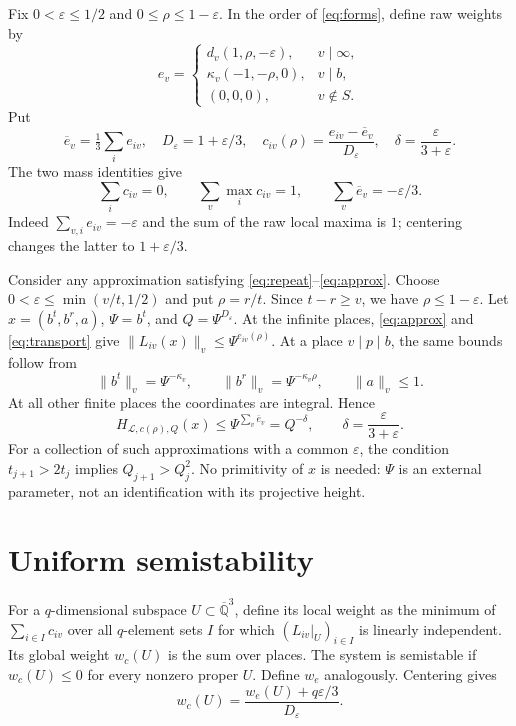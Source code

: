 \documentclass[11pt]{article}
\numberwithin{equation}{section}
\theoremstyle{remark}\newtheorem{remark}[theorem]{Remark}
\newcommand{\Qbar}{\overline{\mathbb Q}}
\newcommand{\eps}{\varepsilon}\newcommand{\LL}{\mathcal L}
\begin{document}
Fix $0<\eps\le1/2$ and $0\le\rho\le1-\eps$. In the order of
\eqref{eq:forms}, define raw weights by
\begin{equation}\label{eq:raw}
 e_v=\begin{cases}
 d_v(1,\rho,-\eps),&v\mid\infty,\\
 \kappa_v(-1,-\rho,0),&v\mid b,\\
 (0,0,0),&v\notin S.
 \end{cases}
\end{equation}
Put
\begin{equation}\label{eq:center}
 \overline e_v=\tfrac13\sum_i e_{iv},\quad D_\eps=1+\eps/3,
 \quad c_{iv}(\rho)=\frac{e_{iv}-\overline e_v}{D_\eps},
 \quad \delta=\frac{\eps}{3+\eps}.
\end{equation}
The two mass identities give
\begin{equation}\label{eq:norm}
 \sum_i c_{iv}=0,\qquad \sum_v\max_i c_{iv}=1,
 \qquad \sum_v\overline e_v=-\eps/3.
\end{equation}
Indeed $\sum_{v,i}e_{iv}=-\eps$ and the sum of the raw local maxima
is $1$; centering changes the latter to $1+\eps/3$.

Consider any approximation satisfying \eqref{eq:repeat}--\eqref{eq:approx}.
Choose $0<\eps\le\min(v/t,1/2)$ and put $\rho=r/t$.
Since $t-r\ge v$, we have $\rho\le1-\eps$.
Let $x=(b^t,b^r,a)$, $\Psi=b^t$, and $Q=\Psi^{D_\eps}$.
At the infinite places, \eqref{eq:approx} and \eqref{eq:transport} give
$\|L_{iv}(x)\|_v\le\Psi^{e_{iv}(\rho)}$.
At a place $v\mid p\mid b$, the same bounds follow from
\[
 \|b^t\|_v=\Psi^{-\kappa_v},\qquad
 \|b^r\|_v=\Psi^{-\kappa_v\rho},\qquad \|a\|_v\le1.
\]
At all other finite places the coordinates are integral. Hence
\begin{equation}\label{eq:small}
 H_{\LL,c(\rho),Q}(x)
 \le\Psi^{\sum_v\overline e_v}=Q^{-\delta},
 \qquad \delta=\frac{\eps}{3+\eps}.
\end{equation}
For a collection of such approximations with a common $\eps$, the
condition $t_{j+1}>2t_j$ implies $Q_{j+1}>Q_j^2$.
No primitivity of $x$ is needed: $\Psi$ is an external parameter,
not an identification with its projective height.

\section{Uniform semistability}\label{sec:stable}
For a $q$-dimensional subspace $U\subset\Qbar^3$, define its local
weight as the minimum of $\sum_{i\in I}c_{iv}$ over all $q$-element
sets $I$ for which $(L_{iv}|_U)_{i\in I}$ is linearly independent.
Its global weight $w_c(U)$ is the sum over places. The system is
semistable if $w_c(U)\le0$ for every nonzero proper $U$.
Define $w_e$ analogously. Centering gives
\begin{equation}\label{eq:weightshift}
 w_c(U)=\frac{w_e(U)+q\eps/3}{D_\eps}.
\end{equation}
\end{document}
